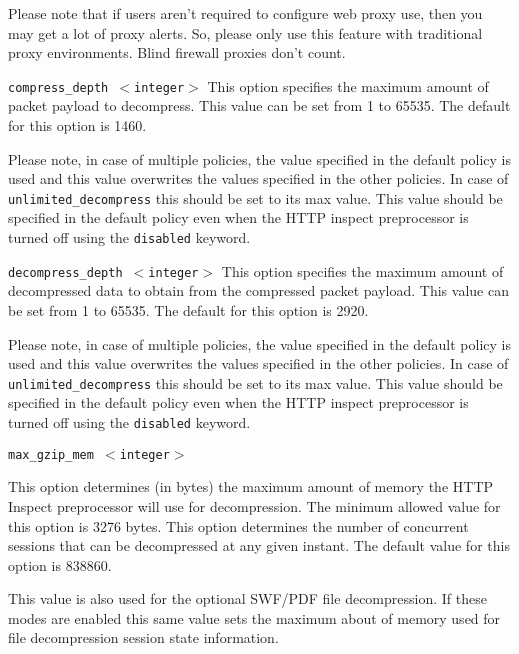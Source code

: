\documentclass[english]{report}
\newcounter{slistnum}
\newenvironment{slist}
{ \begin{list}{ {\bf \arabic{slistnum}.} }{\usecounter{slistnum} } }
{ \end{list} }
\newenvironment{note}{
\samepage
    \vspace{10pt}{\textsf{
        {\hspace{7pt}\Huge{$\triangle$\hspace{-12.5pt}{\Large{$^!$}}}}\hspace{5pt}
        {\Large{NOTE}}
    }
    }
   \begin{center}
    \par\vspace{-17pt}

    \begin{lrbox}{\savepar}
    \begin{minipage}[r]{6in}
}
{
    \end{minipage}
    \end{lrbox}
    \fbox{
        \usebox{
            \savepar
	}
    }
    \par\vskip10pt
    \end{center}
}
\newenvironment{note}{
        \begin{rawhtml}
        <p><table border="1"><tr><td><b>
        Note:&nbsp;&nbsp;</b>
        \end{rawhtml}
}{
        \begin{rawhtml}
        </b></td></tr></table></p>
        \end{rawhtml}
}
\begin{document}
\begin{slist}
Please note that if users aren't required to configure web proxy use, then you
may get a lot of proxy alerts.  So, please only use this feature with
traditional proxy environments. Blind firewall proxies don't count.

\item \texttt{compress\_depth $<$integer$>$}
This option specifies the maximum amount of packet payload to decompress. This
value can be set from 1 to 65535. The default for this option is 1460.

\begin{note}

Please note, in case of multiple policies, the value specified in the default policy
is used and this value overwrites the values specified in the other policies. In case
of \texttt{unlimited\_decompress} this should be set to its max value. This value should 
be specified in the default policy even when the HTTP inspect preprocessor is turned off 
using the \texttt{disabled} keyword.

\end{note}

\item \texttt{decompress\_depth $<$integer$>$}
This option specifies the maximum amount of decompressed data to obtain from the
compressed packet payload. This value can be set from 1 to 65535. The default for
this option is 2920.

\begin{note}

Please note, in case of multiple policies, the value specified in the default policy
is used and this value overwrites the values specified in the other policies. In case
of \texttt{unlimited\_decompress} this should be set to its max value. This value should 
be specified in the default policy even when the HTTP inspect preprocessor is turned off 
using the \texttt{disabled} keyword.

\end{note}

\item \texttt{max\_gzip\_mem $<$integer$>$}

This option determines (in bytes) the maximum amount of memory the HTTP Inspect preprocessor 
will use for decompression. The minimum allowed value for this option is 3276 bytes. This option
determines the number of concurrent sessions that can be decompressed at any given instant.
The default value for this option is 838860.

This value is also used for the optional SWF/PDF file decompression.  If these modes are enabled
this same value sets the maximum about of memory used for file decompression session state
information.


\end{slist}
\end{document}
